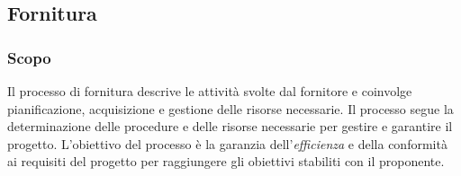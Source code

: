 \documentclass[10pt, a4paper]{article}
\begin{document}
\begin{comment}
Le stime dei tempi di consegna e del prezzo vengono effettuate dal gruppo di lavoro durante la fase di presentazione della candidatura d'appalto.\\
La definizione del prezzo durante la fase di candidatura costituisce il limite superiore invalicabile durante lo svolgimento del progetto ed
è derivante dai costi (stabiliti dal docente del corso) di ciascun ruolo ricopribile all'interno del gruppo di lavoro.\\
Le date di consegna sono invece libere e soggette a stringenti regole di ingresso e vengono stabilite dal gruppo di lavoro assieme al proponente,
cercando di rispettare il più possibile le stime iniziali stabilite durante la fase di candidatura d'appalto.\\
Per assicurare invecece una gestione efficace e attenuare i rischi legati all'acquisizione, il team si impegna a:
\begin{itemize}
    \item svolgere attività di diario di bordo con il docente del corso;
    \item svolgere revisioni congiunte con l'azienda proponente, trattate nel paragrafo (\S Processi di supporto, Revisioni congiunte).
\end{itemize}
\end{comment}
\subsection{Fornitura}
\subsubsection{Scopo}
Il processo di fornitura descrive le attività svolte dal fornitore e coinvolge pianificazione, acquisizione e gestione delle risorse 
necessarie. Il processo segue la determinazione delle procedure e delle risorse necessarie per gestire e garantire il progetto.
L'obiettivo del processo è la garanzia dell'\textit{efficienza\pg} e della conformità ai requisiti del progetto per raggiungere gli obiettivi stabiliti 
con il proponente. 
\end{document}
